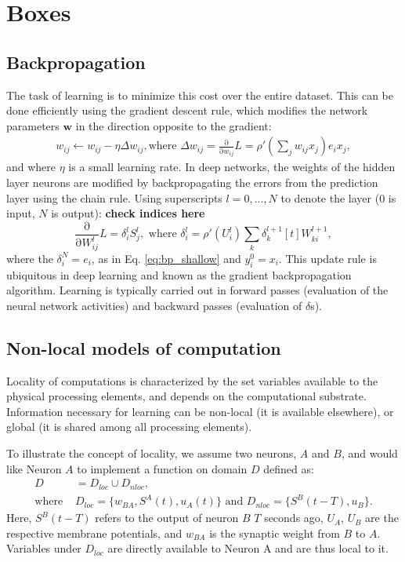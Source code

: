 \documentclass[journal,onecolumn,11pt]{IEEEtran}
\begin{document}
\section*{Boxes}
\subsection{Backpropagation}
The task of learning is to minimize this cost over the entire dataset.
This can be done efficiently using the gradient descent rule, which modifies the network parameters $\mathbf{w}$ in the direction opposite to the gradient:
%
\begin{equation}\label{eq:bp_shallow}
  \begin{split}
    w_{ij} \leftarrow w_{ij} - \eta \Delta w_{ij},  \text{where } \Delta w_{ij} = \frac{\mathrm{\partial}}{\mathrm{\partial} w_{ij}} L = \rho'\left(\sum_j w_{ij} x_j\right) e_i x_j,
  \end{split}
\end{equation}
%
and where $\eta$ is a small learning rate. 
In deep networks, the weights of the hidden layer neurons are modified by backpropagating the errors from the prediction layer using the chain rule. 
  Using superscripts $l=0,...,N$ to denote the layer ($0$ is input, $N$ is output):
%
{\bf check indices here}
\begin{equation}\label{eq:bp_deep}
  \frac{\mathrm{\partial}}{\mathrm{\partial} W^{l}_{ij}} L = \delta_{i}^{l}  S^{l}_j,\text{ where }\delta_{i}^{l} = \rho'\left( U_i^l \right) \sum_k \delta_{k}^{l+1}[t] W_{ki}^{l+1},
\end{equation}
  where the $\delta_{i}^N=e_i$, as in Eq. \ref{eq:bp_shallow} and $y_{i}^0=x_i$.
% 
This update rule is ubiquitous in deep learning \cite{Rumelhart_etal88_paradist} and known as the gradient backpropagation algorithm.   
Learning is typically carried out in forward passes (evaluation of the neural network activities) and backward passes (evaluation of $\delta$s).

\subsection{Non-local models of computation}
Locality of computations is characterized by the set variables available to the physical processing elements, and depends on the computational substrate.
Information necessary for learning can be non-local (it is available elsewhere), or global (it is shared among all processing elements).

To illustrate the concept of locality, we assume two neurons, $A$ and $B$, and would like Neuron $A$ to implement a function on domain $D$ defined as:
\[ 
  \begin{split}
    D & = D_{loc} \cup D_{nloc},\\
    \text{where } &D_{loc}=\{w_{BA},S^A(t), u_A(t)\}\text{ and }D_{nloc} = \{ S^B(t-T), u_{B}\}.
  \end{split}
\]
Here, $S^B(t-T)$ refers to the output of neuron $B$ $T$ seconds ago, $U_A$, $U_B$ are the respective membrane potentials, and $w_{BA}$ is the synaptic weight from $B$ to $A$.  
Variables under $D_{loc}$ are directly available to Neuron A and are thus local to it. 
  
\end{document}
